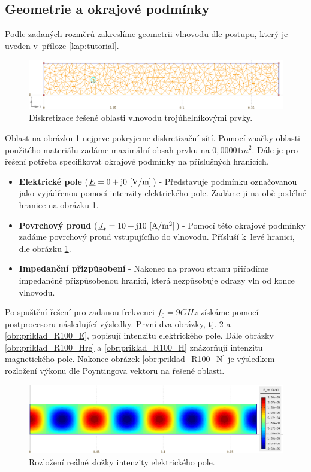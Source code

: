 \subsection*{Geometrie a okrajové podmínky}
Podle zadaných rozměrů zakreslíme geometrii vlnovodu dle postupu, který je uveden v~příloze \ref{kap:tutorial}. 
\begin{figure}[!h]
	\centering
	\includegraphics[width=15cm]{priklad_R100_diskretizace.png}
	\caption{Diskretizace řešené oblasti vlnovodu trojúhelníkovými prvky.}
	\label{obr:priklad_R100_diskretizace}
\end{figure}
Oblast na obrázku \ref{obr:priklad_R100_diskretizace} nejprve pokryjeme diskretizační sítí. Pomocí značky oblasti použitého materiálu zadáme maximální obsah prvku na $0,00001 \unit{m^{2}}$. Dále je pro řešení potřeba specifikovat okrajové podmínky na příslušných hranicích.
\begin{itemize}
\item {\bf Elektrické pole} (${\underline{E}} = 0 + \mathrm{j}0\mathrm{\ [V/m]}$) - Představuje podmínku označovanou jako  vyjádřenou pomocí intenzity elektrického pole. Zadáme ji na obě podélné hranice na obrázku \ref{obr:priklad_R100_diskretizace}.
\item {\bf Povrchový proud} (${\underline{J}}_{t} = 10 + \mathrm{j}10\mathrm{\ [A/m^{2}]}$) - Pomocí této okrajové podmínky zadáme povrchový proud vstupujícího do vlnovodu. Přísluší k~levé hranici, dle obrázku \ref{obr:priklad_R100_diskretizace}.
\item {\bf Impedanční přizpůsobení} - Nakonec na pravou stranu přiřadíme impedančně přizpůsobenou hranici, která nezpůsobuje odrazy vln od konce vlnovodu.
\end{itemize}
Po spuštění řešení pro zadanou frekvenci $f_0 = 9\unit{GHz}$ získáme pomocí postprocesoru následující výsledky. První dva obrázky, tj. \ref{obr:priklad_R100_Ere} a \ref{obr:priklad_R100_E}, popisují intenzitu elektrického pole. Dále obrázky \ref{obr:priklad_R100_Hre} a \ref{obr:priklad_R100_H} znázorňují intenzitu magnetického pole. Nakonec obrázek \ref{obr:priklad_R100_N} je výsledkem rozložení výkonu dle Poyntingova vektoru na řešené oblasti.
\begin{figure}[!h]
	\centering
	\includegraphics[width=15cm]{priklad_R100_Ere.png}
	\caption{Rozložení reálné složky intenzity elektrického pole.}
	\label{obr:priklad_R100_Ere}
\end{figure}
